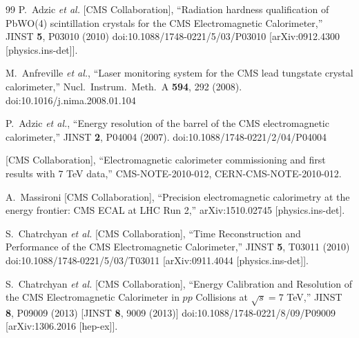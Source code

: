 \begin{thebibliography}{99}
  P.~Adzic {\it et al.} [CMS Collaboration],
  ``Radiation hardness qualification of PbWO(4) scintillation crystals for the CMS Electromagnetic Calorimeter,''
  JINST {\bf 5}, P03010 (2010)
  doi:10.1088/1748-0221/5/03/P03010
  [arXiv:0912.4300 [physics.ins-det]].
  
  M.~Anfreville {\it et al.},
  ``Laser monitoring system for the CMS lead tungstate crystal calorimeter,''
  Nucl.\ Instrum.\ Meth.\ A {\bf 594}, 292 (2008).
  doi:10.1016/j.nima.2008.01.104
  
  P.~Adzic {\it et al.},
  ``Energy resolution of the barrel of the CMS electromagnetic calorimeter,''
  JINST {\bf 2}, P04004 (2007).
  doi:10.1088/1748-0221/2/04/P04004
    
  [CMS Collaboration],
  ``Electromagnetic calorimeter commissioning and first results with 7 TeV data,''
  CMS-NOTE-2010-012, CERN-CMS-NOTE-2010-012.
  
  A.~Massironi [CMS Collaboration],
  ``Precision electromagnetic calorimetry at the energy frontier: CMS ECAL at LHC Run 2,''
  arXiv:1510.02745 [physics.ins-det].
  
  S.~Chatrchyan {\it et al.} [CMS Collaboration],
  ``Time Reconstruction and Performance of the CMS Electromagnetic Calorimeter,''
  JINST {\bf 5}, T03011 (2010)
  doi:10.1088/1748-0221/5/03/T03011
  [arXiv:0911.4044 [physics.ins-det]].
  
  S.~Chatrchyan {\it et al.} [CMS Collaboration],
  ``Energy Calibration and Resolution of the CMS Electromagnetic Calorimeter in $pp$ Collisions at $\sqrt{s} = 7$ TeV,''
  JINST {\bf 8}, P09009 (2013)
  [JINST {\bf 8}, 9009 (2013)]
  doi:10.1088/1748-0221/8/09/P09009
  [arXiv:1306.2016 [hep-ex]].
  

\end{thebibliography}
